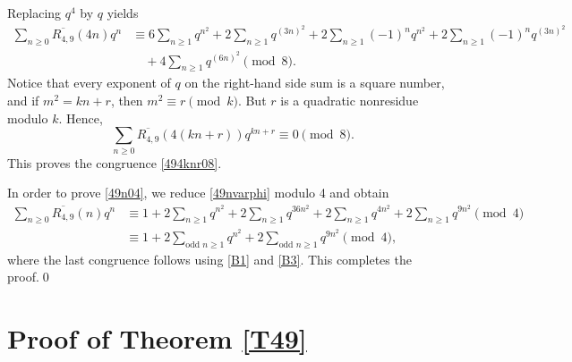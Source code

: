 \documentclass{amsart}
\theoremstyle{definition}
\begin{document}
Replacing $q^4$ by $q$ yields 
\begin{align*}
    \sum_{n\geq0}\overline{R_{4,9}}(4n)q^{n}&\equiv6\sum_{n\geq1}q^{n^2}+2\sum_{n\geq1}q^{(3n)^2}+2\sum_{n\geq1}(-1)^nq^{n^2}+2\sum_{n\geq1}(-1)^nq^{(3n)^2}\\
    &\quad +4\sum_{n\geq1}q^{(6n)^2} \pmod{8}.
\end{align*}
Notice that every exponent of $q$ on the right-hand side sum is a square number, and if $m^2=kn+r$, then $m^2\equiv r\pmod{k}$. But $r$ is a quadratic nonresidue modulo $k$. Hence,
$$\sum_{n\geq0}\overline{R_{4,9}}(4(kn+r))q^{kn+r}\equiv0\pmod{8}.$$
This proves the congruence \eqref{494knr08}.

In order to prove \eqref{49n04}, we reduce \eqref{49nvarphi} modulo 4 and obtain
\begin{align*}
\sum_{n\geq 0}\overline{R_{4,9}}(n)q^n
&\equiv1+2\sum_{n\geq1}q^{n^2}+2\sum_{n\geq1}q^{36n^2}+2\sum_{n\geq1}q^{4n^2}+2\sum_{n\geq1}q^{9n^2} \pmod{4}\\
&\equiv1+2\sum_{\text{odd }n\geq1}q^{n^2}+2\sum_{\text{odd }n\geq1}q^{9n^2}\pmod{4},
\end{align*}
where the last congruence follows using \eqref{B1} and \eqref{B3}.
This completes the proof.\qed
\section{Proof of Theorem \ref{T49}}
\end{document}
